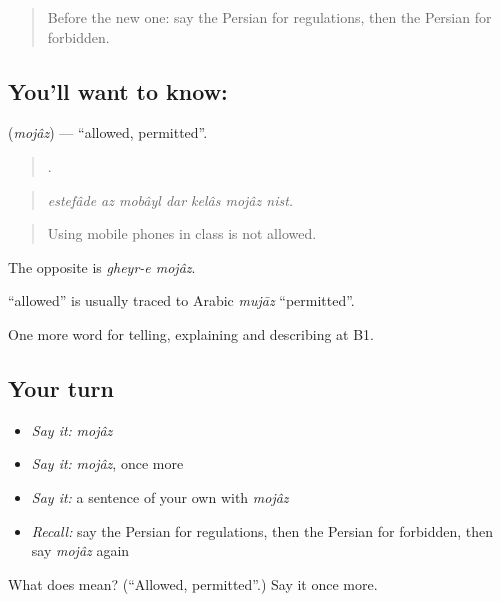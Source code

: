 \begin{quote}
Before the new one: say the Persian for regulations, then the Persian for forbidden.
\end{quote}

\subsection*{You'll want to know: }
\textbf{} (\emph{mojâz}) — \textquotedblleft{}allowed, permitted\textquotedblright{}.

\begin{quote}
      .
\end{quote}

\begin{quote}
\emph{estefâde az mobâyl dar kelâs mojâz nist.}
\end{quote}

\begin{quote}
Using mobile phones in class is not allowed.
\end{quote}

The opposite is \emph{gheyr-e mojâz}.

\begin{cousinweb}
\textbf{} \textquotedblleft{}allowed\textquotedblright{} is usually traced to Arabic \emph{mujāz} \textquotedblleft{}permitted\textquotedblright{}.
\end{cousinweb}

\begin{grammarlens}[title={What you've built}]
One more word for telling, explaining and describing at B1.
\end{grammarlens}

\subsection*{Your turn}
\begin{itemize}
\raggedright
  \item \emph{Say it:} \emph{mojâz}
  \item \emph{Say it:} \emph{mojâz}, once more
  \item \emph{Say it:} a sentence of your own with \emph{mojâz}
  \item \emph{Recall:} say the Persian for regulations, then the Persian for forbidden, then say \emph{mojâz} again
\end{itemize}

\begin{tcolorbox}[breakable,colback=teal!4,colframe=teal!35!black,title={Before you move on}]
What does  mean? (\textquotedblleft{}Allowed, permitted\textquotedblright{}.) Say it once more.
\end{tcolorbox}
